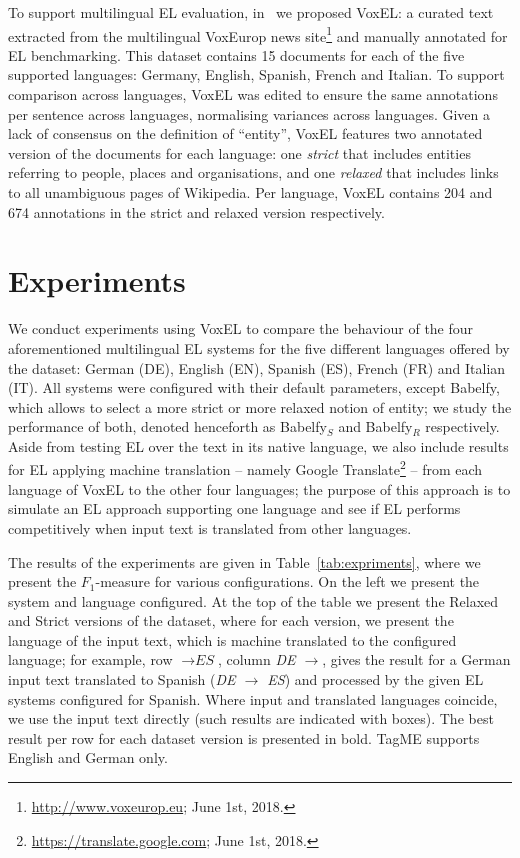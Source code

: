 \documentclass{llncs}
\begin{document}
To support multilingual EL evaluation, in~\cite{ourISWC} we proposed VoxEL: a curated text extracted from the multilingual VoxEurop news site\footnote{\url{http://www.voxeurop.eu}; June 1st, 2018.} and manually annotated for EL benchmarking. This dataset contains 15 documents for each of the five supported languages: Germany, English, Spanish, French and Italian. To support comparison across languages, VoxEL was edited to ensure the same annotations per sentence across languages, normalising variances across languages. Given a lack of consensus on the definition of ``entity'', VoxEL features two annotated version of the documents for each language: one \textit{strict} that includes entities referring to people, places and organisations, and one \textit{relaxed} that includes links to all unambiguous pages of Wikipedia. Per language, VoxEL contains 204 and 674 annotations in the strict and relaxed version respectively.

\section{Experiments}

We conduct experiments using VoxEL to compare the behaviour of the four aforementioned multilingual EL systems for the five different languages offered by the dataset: German (DE), English (EN), Spanish (ES), French (FR) and Italian (IT). All systems were configured with their default parameters, except Babelfy, which allows to select a more strict or more relaxed notion of entity; we study the performance of both, denoted henceforth as Babelfy$_S$ and Babelfy$_R$ respectively. Aside from testing EL over the text in its native language, we also include results for EL applying machine translation -- namely Google Translate\footnote{\url{https://translate.google.com}; June 1st, 2018.} -- from each language of VoxEL to the other four languages; the purpose of this approach is to simulate an EL approach supporting one language and see if EL performs competitively when input text is translated from other languages. 

The results of the experiments are given in Table~\ref{tab:expriments}, where we present the $F_1$-measure for various configurations. On the left we present the system and language configured. At the top of the table we present the Relaxed and Strict versions of the dataset, where for each version, we present the language of the input text, which is machine translated to the configured language; for example, row $\rightarrow \textit{ES}$, column \textit{DE $\rightarrow$}, gives the result for a German input text translated to Spanish (\textit{DE $\rightarrow$ ES}) and processed by the given EL systems configured for Spanish. Where input and translated languages coincide, we use the input text directly (such results are indicated with boxes). The best result per row for each dataset version is presented in bold. TagME supports English and German only.
\end{document}
